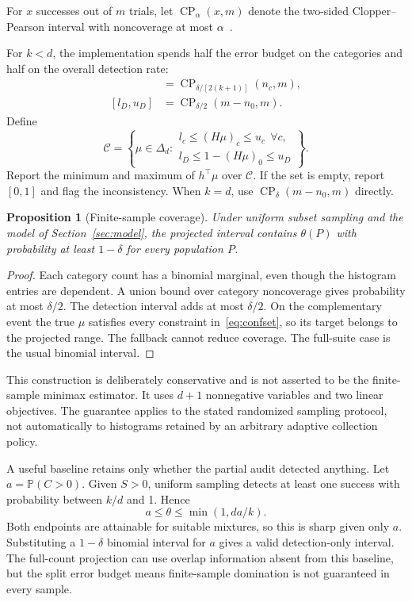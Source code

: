 \documentclass[conference]{IEEEtran}
\newtheorem{proposition}[theorem]{Proposition}
\newcommand{\Prob}{\mathbb{P}}
\newcommand{\simplex}{\Delta_d}
\begin{document}
For $x$ successes out of $m$ trials, let $\operatorname{CP}_\alpha(x,m)$ denote the two-sided Clopper--Pearson interval with noncoverage at most $\alpha$~\cite{clopper}. 

For $k<d$, the implementation spends half the error budget on the categories and half on the overall detection rate:
\begin{align}
 [l_c,u_c]&=\operatorname{CP}_{\delta/[2(k+1)]}(n_c,m),\\
 [l_D,u_D]&=\operatorname{CP}_{\delta/2}(m-n_0,m).
\end{align}
Define
\begin{equation}\label{eq:confset}
 \mathcal C=\left\{\mu\in\simplex:
 \begin{array}{l}l_c\leq (H\mu)_c\leq u_c\ \ \forall c,\\
 l_D\leq1-(H\mu)_0\leq u_D
 \end{array}\right\}.
\end{equation}
Report the minimum and maximum of $h^\top\mu$ over $\mathcal C$. If the set is empty, report $[0,1]$ and flag the inconsistency. When $k=d$, use $\operatorname{CP}_\delta(m-n_0,m)$ directly.

\begin{proposition}[Finite-sample coverage]\label{prop:coverage}
Under uniform subset sampling and the model of Section~\ref{sec:model}, the projected interval contains $\theta(P)$ with probability at least $1-\delta$ for every population $P$.
\end{proposition}
\begin{proof}
Each category count has a binomial marginal, even though the histogram entries are dependent. A union bound over category noncoverage gives probability at most $\delta/2$. The detection interval adds at most $\delta/2$. On the complementary event the true $\mu$ satisfies every constraint in~\eqref{eq:confset}, so its target belongs to the projected range. The fallback cannot reduce coverage. The full-suite case is the usual binomial interval.
\end{proof}

This construction is deliberately conservative and is not asserted to be the finite-sample minimax estimator. It uses $d+1$ nonnegative variables and two linear objectives. The guarantee applies to the stated randomized sampling protocol, not automatically to histograms retained by an arbitrary adaptive collection policy.

A useful baseline retains only whether the partial audit detected anything. Let $a=\Prob(C>0)$. Given $S>0$, uniform sampling detects at least one success with probability between $k/d$ and 1. Hence
\begin{equation}\label{eq:detector}
 a\leq\theta\leq\min(1,da/k).
\end{equation}
Both endpoints are attainable for suitable mixtures, so this is sharp given only $a$. Substituting a $1-\delta$ binomial interval for $a$ gives a valid detection-only interval. The full-count projection can use overlap information absent from this baseline, but the split error budget means finite-sample domination is not guaranteed in every sample.
\end{document}
